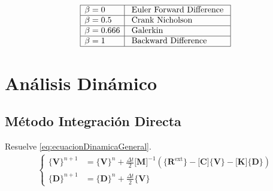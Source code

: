 \documentclass[11pt, a4paper,titlepage]{article}
\newcommand{\Mme}[1]{\boldsymbol{[}\mathbf{#1} \boldsymbol{]}}
\newcommand{\Cme}[1]{\boldsymbol{\{ }\mathbf{#1} \boldsymbol{\}} }
\newcommand{\MK}{\Mme{K}}
\newcommand{\MC}{\Mme{C}}
\begin{document}
\[
\begin{array}{|l|l|}\hline \beta=0 & {\text { Euler Forward Difference }} \\ \hline \beta=0.5 & {\text { Crank Nicholson }} \\ \hline \beta=0.666 & {\text { Galerkin }} \\ \hline \beta=1 & {\text { Backward Difference }} \\ \hline\end{array}
\]

\section{Análisis Dinámico}

\subsection*{Método Integración Directa}
Resuelve \ref{eq:ecuacionDinamicaGeneral}.
\begin{align*}
	\begin{cases}
	\Cme{V}^{n+1}&=\Cme{V}^n + \frac{\Delta t}{2}  \Mme{M}^{-1}\left(\Cme{R^{\mathrm{ext}}} - \MC \Cme{V} - \MK \Cme{D} \right) \\
	\Cme{D}^{n+1}&=\Cme{D}^n + \frac{\Delta t}{2} \Cme{V}
	\end{cases}
\end{align*}
\end{document}
